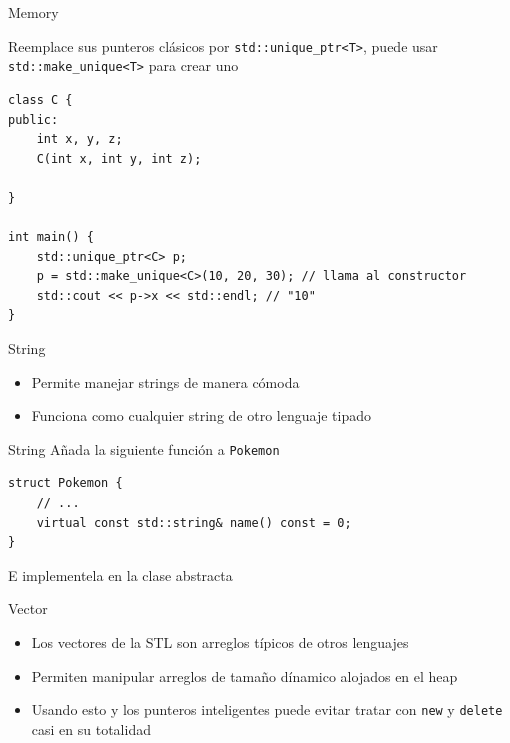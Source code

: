 \documentclass{beamer}
\begin{document}
\begin{frame}[fragile]{Memory}
\begin{center}
    Reemplace sus punteros clásicos por \texttt{std::unique\_ptr<T>}, puede usar \texttt{std::make\_unique<T>} para crear uno
\end{center}

\begin{verbatim}
class C {
public:
    int x, y, z;
    C(int x, int y, int z);

}

int main() {
    std::unique_ptr<C> p;
    p = std::make_unique<C>(10, 20, 30); // llama al constructor 
    std::cout << p->x << std::endl; // "10"
}
\end{verbatim}
\end{frame}

\begin{frame}[fragile]{String}

\begin{itemize}
\item Permite manejar strings de manera cómoda
\item Funciona como cualquier string de otro lenguaje tipado
\end{itemize}
\end{frame}

\begin{frame}[fragile]{String}
Añada la siguiente función a \texttt{Pokemon}
\begin{verbatim}
struct Pokemon {
    // ...
    virtual const std::string& name() const = 0;
}
\end{verbatim}

E implementela en la clase abstracta

\end{frame}

\begin{frame}[fragile]{Vector}

\begin{itemize}
\item Los vectores de la STL son arreglos típicos de otros lenguajes
\item Permiten manipular arreglos de tamaño dínamico alojados en el heap
\item Usando esto y los punteros inteligentes puede evitar tratar con \texttt{new} y \texttt{delete} casi en su totalidad
\end{itemize}
\end{frame}
\end{document}
